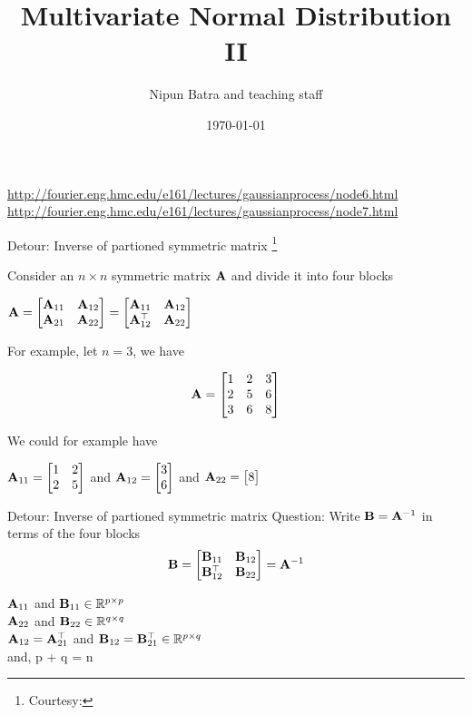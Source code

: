 \documentclass{beamer}
\title{Multivariate Normal Distribution II}
\date{\today}
\author{Nipun Batra and teaching staff}
\institute{IIT Gandhinagar}
\begin{document}
	\maketitle
	
	\urldef\nodeSix\url{http://fourier.eng.hmc.edu/e161/lectures/gaussianprocess/node6.html}
	\urldef\nodeSeven\url{http://fourier.eng.hmc.edu/e161/lectures/gaussianprocess/node7.html}
	
	
	\begin{frame}{Detour: Inverse of partioned symmetric matrix \footnote{Courtesy: \nodeSix}}
		
		Consider an $n\times n$ symmetric matrix $\mathbf{A}$ and divide it into four blocks
		
		$
		\mathbf{A} = \begin{bmatrix}
		\mathbf{A}_{11} & \mathbf{A}_{12}\\
		\mathbf{A}_{21} & \mathbf{A}_{22} \\
		\end{bmatrix} =  \begin{bmatrix}
		\mathbf{A}_{11} & \mathbf{A}_{12}\\
		\mathbf{A}_{12}^\top & \mathbf{A}_{22} \\
		\end{bmatrix}
		$
		
		For example, let $n=3$, we have
		
		$$
		\mA =  \begin{bmatrix}
		1 & 2 & 3\\
		2 & 5 & 6 \\
		3 & 6 & 8 \\
		
	\end{bmatrix}
	$$
	
	We could for example have 
	
	$\mathbf{A}_{11} = \begin{bmatrix}
	1 & 2 \\
	2 & 5 \\
	\end{bmatrix}$ and $\mathbf{A}_{12} = \begin{bmatrix}
	3 \\ 6
	\end{bmatrix}
	$ and $\mathbf{A}_{22} = \begin{bmatrix}
	8
	\end{bmatrix}$
\end{frame}

\begin{frame}{Detour: Inverse of partioned symmetric matrix}
	Question: Write $\mathbf{B} = \mathbf{A}^{-1}$ in terms of the four blocks
	$$
	\mathbf{B} = \begin{bmatrix}
	\mathbf{B}_{11} & \mathbf{B}_{12}\\
	\mathbf{B}_{12}^\top & \mathbf{B}_{22} \\
	\end{bmatrix}
	= \mathbf{A}^{-1}$$

	$\mathbf{A}_{11}$ and $\mathbf{B}_{11} \in \mathbb{R}^{p\times p}$ \\
	$\mathbf{A}_{22}$ and $\mathbf{B}_{22} \in \mathbb{R}^{q\times q}$ \\
	$\mathbf{A}_{12} = \mathbf{A}_{21}^\top$ and $\mathbf{B}_{12} = \mathbf{B}_{21}^\top \in \mathbb{R}^{p\times q}$ \\
	and, p + q = n 
\end{frame}
\end{document}
